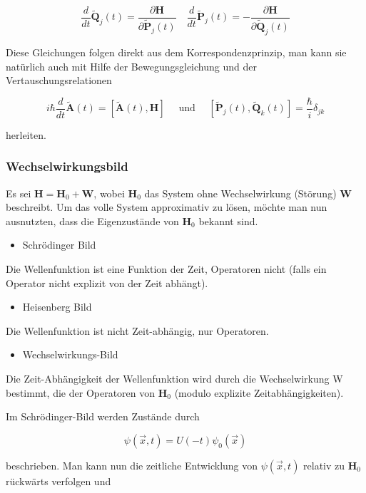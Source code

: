 \documentclass[10pt, letterpaper]{article}
\begin{document}
$$
\frac{d}{d t} \tilde{\mathbf{Q}}_{j}(t)=\frac{\partial \mathbf{H}}{\partial \tilde{\mathbf{P}}_{j}(t)} \quad \frac{d}{d t} \tilde{\mathbf{P}}_{j}(t)=-\frac{\partial \mathbf{H}}{\partial \tilde{\mathbf{Q}}_{j}(t)}
$$

Diese Gleichungen folgen direkt aus dem Korrespondenzprinzip, man kann sie natürlich auch mit Hilfe der Bewegungsgleichung und der Vertauschungsrelationen

$$
i \hbar \frac{d}{d t} \tilde{\mathbf{A}}(t)=[\tilde{\mathbf{A}}(t), \mathbf{H}] \quad \text { und } \quad\left[\tilde{\mathbf{P}}_{j}(t), \tilde{\mathbf{Q}}_{k}(t)\right]=\frac{\hbar}{i} \delta_{j k}
$$

herleiten.

\subsubsection*{Wechselwirkungsbild}
Es sei $\mathbf{H}=\mathbf{H}_{0}+\mathbf{W}$, wobei $\mathbf{H}_{0}$ das System ohne Wechselwirkung (Störung) $\mathbf{W}$ beschreibt. Um das volle System approximativ zu lösen, möchte man nun ausnutzten, dass die Eigenzustände von $\mathbf{H}_{0}$ bekannt sind.

\begin{itemize}
  \item Schrödinger Bild
\end{itemize}

Die Wellenfunktion ist eine Funktion der Zeit, Operatoren nicht (falls ein Operator nicht explizit von der Zeit abhängt).

\begin{itemize}
  \item Heisenberg Bild
\end{itemize}

Die Wellenfunktion ist nicht Zeit-abhängig, nur Operatoren.

\begin{itemize}
  \item Wechselwirkungs-Bild
\end{itemize}

Die Zeit-Abhängigkeit der Wellenfunktion wird durch die Wechselwirkung W bestimmt, die der Operatoren von $\mathbf{H}_{0}$ (modulo explizite Zeitabhängigkeiten).

Im Schrödinger-Bild werden Zustände durch

$$
\psi(\vec{x}, t)=U(-t) \psi_{0}(\vec{x})
$$

beschrieben. Man kann nun die zeitliche Entwicklung von $\psi(\vec{x}, t)$ relativ zu $\mathbf{H}_{0}$ rückwärts verfolgen und
\end{document}
